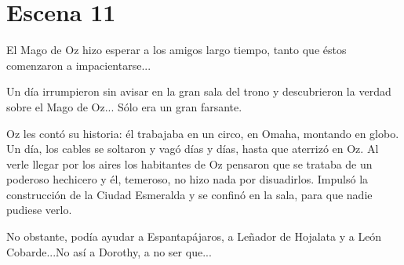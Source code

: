 \chapter{Escena 11}

El Mago de Oz hizo esperar a los amigos largo tiempo, tanto que éstos comenzaron a impacientarse...

Un día irrumpieron sin avisar en la gran sala del trono y descubrieron la verdad sobre el Mago de Oz... Sólo era un gran farsante.

Oz les contó su historia: él trabajaba en un circo, en Omaha, montando en globo. Un día, los cables se soltaron y vagó días y días, hasta que aterrizó en Oz. Al verle llegar por los aires los habitantes de Oz pensaron que se trataba de un poderoso hechicero y él, temeroso, no hizo nada por disuadirlos. Impulsó la construcción de la Ciudad Esmeralda y se confinó en la sala, para que nadie pudiese verlo.

No obstante, podía ayudar a Espantapájaros, a Leñador de Hojalata y a León Cobarde...No así a Dorothy, a no ser que...